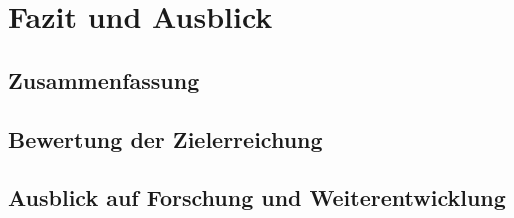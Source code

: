 \chapter{Fazit und Ausblick}\label{ch:fazit}


\section{Zusammenfassung}


\section{Bewertung der Zielerreichung}


\section{Ausblick auf Forschung und Weiterentwicklung}
